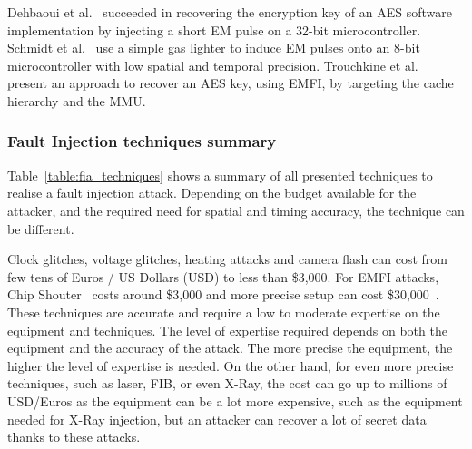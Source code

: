 Dehbaoui et al.~\cite{DMMDT-13-cosade} succeeded in recovering the encryption key of an AES software implementation by injecting a short EM pulse on a 32-bit microcontroller.
Schmidt et al.~\cite{SH-07-austrochip} use a simple gas lighter to induce EM pulses onto an 8-bit microcontroller with low spatial and temporal precision.
Trouchkine et al.~\cite{TBELB-21-jce} present an approach to recover an AES key, using EMFI, by targeting the cache hierarchy and the MMU.

\subsubsection{Fault Injection techniques summary}
Table~\ref{table:fia_techniques} shows a summary of all presented techniques to realise a fault injection attack. Depending on the budget available for the attacker, and the required need for spatial and timing accuracy, the technique can be different.

Clock glitches, voltage glitches, heating attacks and camera flash can cost from few tens of Euros / US Dollars (USD) to less than \$3,000. For EMFI attacks, Chip Shouter~\cite{chipshouter} costs around \$3,000 and more precise setup can cost \$30,000~\cite{BH-22-access}. These techniques are accurate and require a low to moderate expertise on the equipment and techniques. The level of expertise required depends on both the equipment and the accuracy of the attack. The more precise the equipment, the higher the level of expertise is needed. On the other hand, for even more precise techniques, such as laser, FIB, or even X-Ray, the cost can go up to millions of USD/Euros as the equipment can be a lot more expensive, such as the equipment needed for X-Ray injection, but an attacker can recover a lot of secret data thanks to these attacks.

